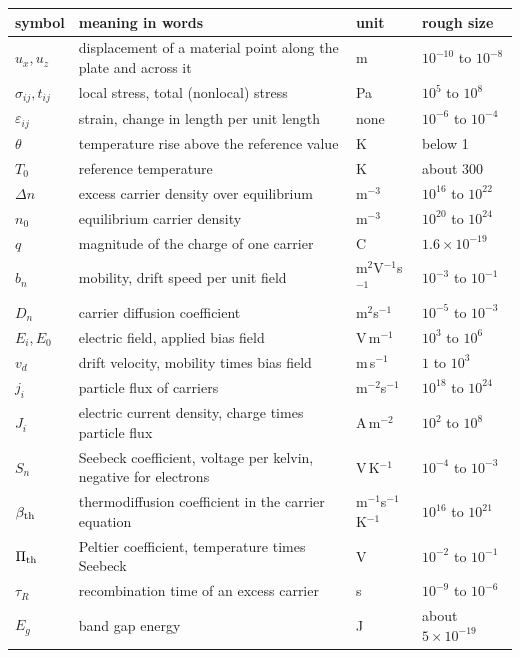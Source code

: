 \documentclass[11pt]{article}
\begin{document}
\begin{center}
\small
\begin{tabular}{p{1.9cm}p{6.0cm}p{2.4cm}p{2.6cm}}
\toprule
symbol & meaning in words & unit & rough size\\
\midrule
$u_x,u_z$ & displacement of a material point along the plate and across it & m & $10^{-10}$ to $10^{-8}$\\
$\sigma_{ij},t_{ij}$ & local stress, total (nonlocal) stress & Pa & $10^{5}$ to $10^{8}$\\
$\varepsilon_{ij}$ & strain, change in length per unit length & none & $10^{-6}$ to $10^{-4}$\\
$\theta$ & temperature rise above the reference value & K & below 1\\
$T_0$ & reference temperature & K & about 300\\
$\Delta n$ & excess carrier density over equilibrium & m$^{-3}$ & $10^{16}$ to $10^{22}$\\
$n_0$ & equilibrium carrier density & m$^{-3}$ & $10^{20}$ to $10^{24}$\\
$q$ & magnitude of the charge of one carrier & C & $1.6\times10^{-19}$\\
$b_n$ & mobility, drift speed per unit field & m$^2$V$^{-1}$s$^{-1}$ & $10^{-3}$ to $10^{-1}$\\
$D_n$ & carrier diffusion coefficient & m$^2$s$^{-1}$ & $10^{-5}$ to $10^{-3}$\\
$E_i,E_0$ & electric field, applied bias field & V\,m$^{-1}$ & $10^{3}$ to $10^{6}$\\
$v_d$ & drift velocity, mobility times bias field & m\,s$^{-1}$ & $1$ to $10^{3}$\\
$j_i$ & particle flux of carriers & m$^{-2}$s$^{-1}$ & $10^{18}$ to $10^{24}$\\
$J_i$ & electric current density, charge times particle flux & A\,m$^{-2}$ & $10^{2}$ to $10^{8}$\\
$S_n$ & Seebeck coefficient, voltage per kelvin, negative for electrons & V\,K$^{-1}$ & $10^{-4}$ to $10^{-3}$\\
$\beta_{\rm th}$ & thermodiffusion coefficient in the carrier equation & m$^{-1}$s$^{-1}$K$^{-1}$ & $10^{16}$ to $10^{21}$\\
$\Pi_{\rm th}$ & Peltier coefficient, temperature times Seebeck & V & $10^{-2}$ to $10^{-1}$\\
$\tau_R$ & recombination time of an excess carrier & s & $10^{-9}$ to $10^{-6}$\\
$E_g$ & band gap energy & J & about $5\times10^{-19}$\\

\end{tabular}
\end{center}
\end{document}

